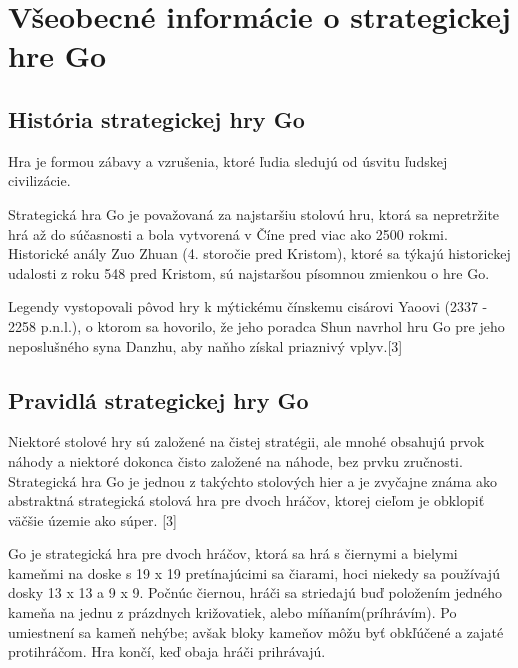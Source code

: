 \documentclass[10pt,twoside,slovak,a4paper]{article}
\begin{document}


\section{Všeobecné informácie o strategickej hre Go}
\subsection{História strategickej hry Go}
Hra je formou zábavy a vzrušenia, ktoré ľudia sledujú od úsvitu ľudskej civilizácie.

Strategická hra Go je považovaná za najstaršiu stolovú hru, ktorá sa nepretržite hrá až do súčasnosti a bola vytvorená v Číne pred viac ako 2500 rokmi. Historické anály Zuo Zhuan (4. storočie pred Kristom), ktoré sa týkajú historickej udalosti z roku 548 pred Kristom, sú najstaršou písomnou zmienkou o hre Go. 

Legendy vystopovali pôvod hry k mýtickému čínskemu cisárovi Yaoovi (2337 - 2258 p.n.l.), o ktorom sa hovorilo, že jeho poradca Shun navrhol hru Go pre jeho neposlušného syna Danzhu, aby naňho získal priaznivý vplyv.[3]

\subsection{Pravidlá strategickej hry Go}
Niektoré stolové hry sú založené na čistej stratégii, ale mnohé obsahujú prvok náhody a niektoré dokonca čisto založené na náhode, bez prvku zručnosti. Strategická hra Go je jednou z takýchto stolových hier a je zvyčajne známa ako abstraktná strategická stolová hra pre dvoch hráčov, ktorej cieľom je obklopiť väčšie územie ako súper. [3]

Go je strategická hra pre dvoch hráčov, ktorá sa hrá s čiernymi a bielymi kameňmi na doske s 19 x 19 pretínajúcimi sa čiarami, hoci niekedy sa používajú dosky 13 x 13 a 9 x 9. Počnúc čiernou, hráči sa striedajú buď položením jedného kameňa na jednu z prázdnych križovatiek, alebo míňaním(príhrávím). Po umiestnení sa kameň nehýbe; avšak bloky kameňov môžu byť obkľúčené a zajaté protihráčom. Hra končí, keď obaja hráči prihrávajú. 
\end{document}
